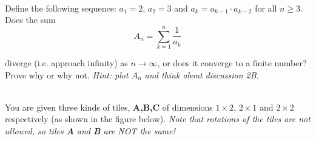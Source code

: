 \documentclass[11pt]{article}
\newif\ifsolutions
\begin{document}
\begin{qunlist}
 \\
Define the following sequence: $a_1 =2$, $a_2 = 3$ and $a_k = a_{k-1} \cdot a_{k-2}$ for all $n \geq 3$. \\ 
Does the sum 
\[ A_n = \sum_{k=1}^n \frac{1}{a_k} \]

diverge (i.e. approach infinity) as $n \to \infty$, or does it converge to a finite number?  
Prove why or why not.
{\em Hint: plot $A_n$ and think about discussion 2B.}

\ifsolutions
\textbf{Solutions:}
It does converge. We can first use strong induction to prove the claim
\[ a_k > 2^k, \quad \forall k \geq 4 \] 

For the base cases we have $a_4 = a_3 \cdot a_2 = 6 \cdot 3 = 18 > 2^4$ 
and $a_5 = a_4 \cdot a_3 = 18 \cdot 6 = 108 > 2^5$. Then for the inductive step we have
\[ a_{k+1} = a_k \cdot a_{k-1} > 2^k \cdot 2^{k-1} = 2^{2k-1} > 2^{k+1} \]

Therefore:
\[ \sum_{k=4}^n \frac{1}{a_k} < \sum_{k=4}^n \frac{1}{2^k} \]

Since the RHS converges as $n \to \infty$, we know the LHS converges.  
Adding a constant (i.e. the first three terms) does not change the fact that it converges.
\fi


%
%
%



 \\
You are given three kinds of tiles, \textbf{A,B,C} of dimensions $1 \times 2$, $2 \times 1$
and $2 \times 2$ respectively (as shown in the figure below).
\textit{Note that rotations of the tiles are not allowed, so tiles \textbf{A} and \textbf{B} are NOT the same!}


\end{qunlist}
\end{document}
